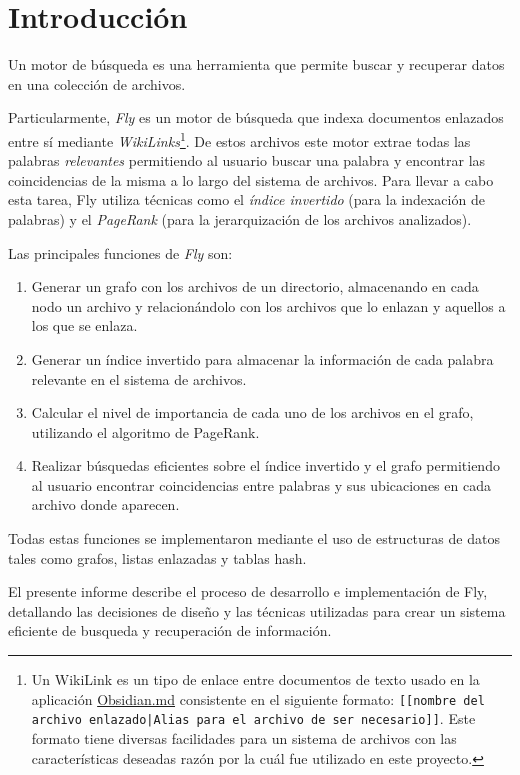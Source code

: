 \section{Introducción}
Un motor de búsqueda es una herramienta que permite buscar y recuperar datos en una colección de archivos.

Particularmente, \textit{Fly} es un motor de búsqueda que indexa documentos enlazados entre sí mediante \textit{WikiLinks}\footnote{Un WikiLink es un tipo de enlace entre documentos de texto usado en la aplicación \href{https://obsidian.md/}{Obsidian.md} consistente en el siguiente formato: \texttt{[[nombre del archivo enlazado|Alias para el archivo de ser necesario]]}. Este formato tiene diversas facilidades para un sistema de archivos con las características deseadas razón por la cuál fue utilizado en este proyecto.}. De estos archivos este motor extrae todas las palabras \textit{relevantes} permitiendo al usuario buscar una palabra y encontrar las coincidencias de la misma a lo largo del sistema de archivos. Para llevar a cabo esta tarea, Fly utiliza técnicas como el \textit{índice invertido} (para la indexación de palabras) y el \textit{PageRank} (para la jerarquización de los archivos analizados).

Las principales funciones de \textit{Fly} son:
\begin{enumerate}
    \item Generar un grafo con los archivos de un directorio, almacenando en cada nodo un archivo y relacionándolo con los archivos que lo enlazan y aquellos a los que se enlaza.
    \item Generar un índice invertido para almacenar la información de cada palabra relevante en el sistema de archivos.
    \item Calcular el nivel de importancia de cada uno de los archivos en el grafo, utilizando el algoritmo de PageRank.
    \item Realizar búsquedas eficientes sobre el índice invertido y el grafo permitiendo al usuario encontrar coincidencias entre palabras y sus ubicaciones en cada archivo donde aparecen.
\end{enumerate}

Todas estas funciones se implementaron mediante el uso de estructuras de datos tales como grafos, listas enlazadas y tablas hash.

El presente informe describe el proceso de desarrollo e implementación de Fly, detallando las decisiones de diseño y las técnicas utilizadas para crear un sistema eficiente de busqueda y recuperación de información.